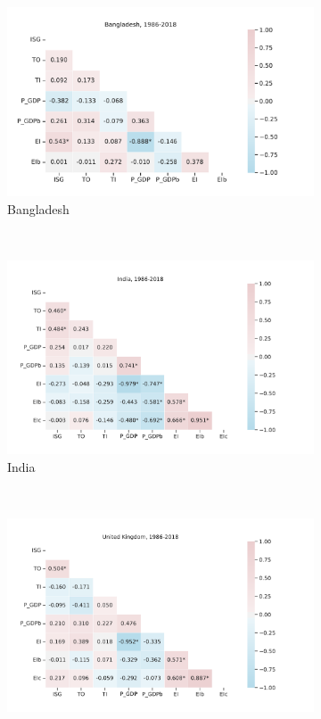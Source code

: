 \documentclass[11pt,a4paper]{article}
\begin{document}
\begin{figure}[htbp]
\centering
\begin{subfigure}{0.7\textwidth}
\includegraphics[width=\textwidth]{./plots/BGD_current_diff_correlations.pdf}
\caption{Bangladesh}
\end{subfigure}\\
\begin{subfigure}{0.7\textwidth}
\includegraphics[width=\textwidth]{./plots/IND_current_diff_correlations.pdf}
\caption{India}
\label{fig:logdiff_correlations_india}
\end{subfigure}\\
\begin{subfigure}{0.7\textwidth}
\includegraphics[width=\textwidth]{./plots/GBR_current_diff_correlations.pdf}

\end{subfigure}
\end{figure}
\end{document}
